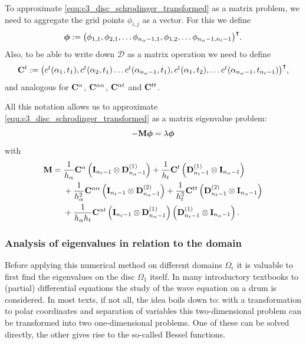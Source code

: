 To approximate \eqref{equ:c3_disc_schrodinger_transformed} as a matrix problem, we need to aggregate the grid points $\phi_{i,j}$ as a vector. For this we define
$$
    \vb*{\phi} := {\begin{pmatrix}
            \phi_{1,1}, \phi_{2,1}, \dots \phi_{n_\alpha-1, 1}, \phi_{1,2}, \dots \phi_{n_\alpha-1, n_t-1}
        \end{pmatrix}}^\intercal\text{.}
$$
Also, to be able to write down $\mathcal{D}$ as a matrix operation we need to define
$$
    \vb{C}^{t} := {\begin{pmatrix}
            c^{t}(\alpha_1, t_1), c^{t}(\alpha_2, t_1) \dots c^{t}(\alpha_{n_\alpha-1}, t_1), c^{t}(\alpha_1, t_2), \dots c^{t}({\alpha_{n_\alpha-1}, t_{n_t-1}})
        \end{pmatrix}}^\intercal\text{,}
$$
and analogous for $\vb{C}^{\alpha}$, $\vb{C}^{\alpha\alpha}$, $\vb{C}^{\alpha t}$ and $\vb{C}^{t t}$.

All this notation allows us to approximate \eqref{equ:c3_disc_schrodinger_transformed} as a matrix eigenvalue problem:
$$
    -\vb{M} \vb*{\phi} = \lambda \vb*{\phi}
$$
with
\begin{align*}
    \vb{M} = {} & \frac{1}{h_\alpha} \vb{C}^{\alpha} \left(\vb{I}_{n_t - 1}\otimes \vb{D}^{(1)}_{n_\alpha - 1} \right) + \frac{1}{h_t} \vb{C}^{t} \left(\vb{D}^{(1)}_{n_t - 1}  \otimes \vb{I}_{n_\alpha - 1}\right)                \\
                & {} + \frac{1}{h_\alpha^2} \vb{C}^{\alpha\alpha} \left(\vb{I}_{n_t - 1}\otimes \vb{D}^{(2)}_{n_\alpha - 1}\right) + \frac{1}{h_t^2} \vb{C}^{tt} \left(\vb{D}^{(2)}_{n_t - 1}  \otimes \vb{I}_{n_\alpha - 1}\right) \\
                & {} + \frac{1}{h_\alpha h_t} \vb{C}^{\alpha t} \left(\vb{I}_{n_t - 1}\otimes \vb{D}^{(1)}_{n_\alpha - 1} \right) \left( \vb{D}^{(1)}_{n_t - 1}  \otimes \vb{I}_{n_\alpha - 1} \right)\text{.}
\end{align*}

\subsubsection{Analysis of eigenvalues in relation to the domain}

Before applying this numerical method on different domains $\Omega_\epsilon$ it is valuable to first find the eigenvalues on the disc $\Omega_1$ itself. In many introductory textbooks to (partial) differential equations the study of the wave equation on a drum is considered. In most texts, if not all, the idea boils down to: with a transformation to polar coordinates and separation of variables this two-dimensional problem can be transformed into two one-dimensional problems. One of these can be solved directly, the other gives rise to the so-called Bessel functions.

